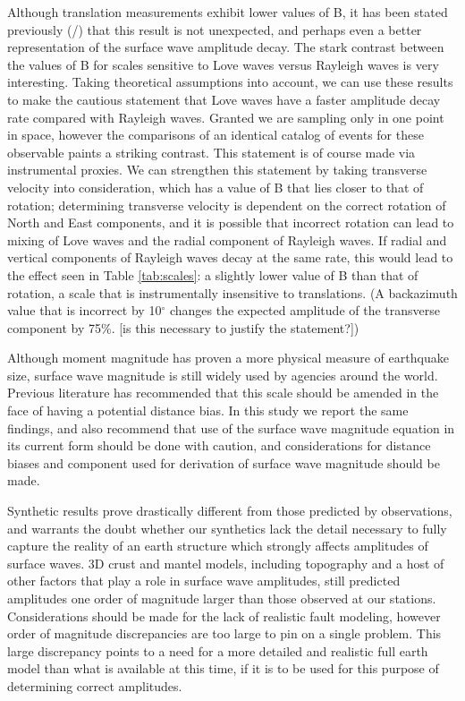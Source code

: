 \documentclass{gji}
\begin{document}
Although translation measurements exhibit lower values of B, it has been stated previously (\cite{herak1993distance}/\cite{ambraseys1997surface}) that this result is not unexpected, and perhaps even a better representation of the surface wave amplitude decay. The stark contrast between the values of B for scales sensitive to Love waves versus Rayleigh waves is very interesting. Taking theoretical assumptions into account, we can use these results to make the cautious statement that Love waves have a faster amplitude decay rate  compared with  Rayleigh waves. Granted we are sampling only in one point in space, however the comparisons of an identical catalog of events for these observable paints a striking contrast. This statement is of course made via instrumental proxies. We can strengthen this statement by taking transverse velocity into consideration, which has a value of B that lies closer to that of rotation; determining transverse velocity is dependent on the correct rotation of North and East components, and it is possible that incorrect rotation can lead to mixing of Love waves and the radial component of Rayleigh waves. If radial and vertical components of Rayleigh waves decay at the same rate, this would lead to the effect seen in Table \ref{tab:scales}: a slightly lower value of B than that of rotation, a scale that is instrumentally insensitive to translations. (A backazimuth value that is incorrect by 10$^\circ$ changes the expected amplitude of the transverse component by 75\%. [is this necessary to justify the statement?]) %

Although moment magnitude has proven a more physical measure of earthquake size, surface wave magnitude is still widely used by agencies around the world. Previous literature has recommended that this scale should be amended in the face of having a potential distance bias. In this study we report the same findings, and also recommend that use of the surface wave magnitude equation in its current form should be done with caution, and considerations for distance biases and component used for derivation of surface wave magnitude should be made.

Synthetic results prove drastically different from those predicted by observations, and warrants the doubt whether our synthetics lack the detail necessary to fully capture the reality of an earth structure which strongly affects amplitudes of surface waves. 3D crust and mantel models, including topography and a host of other factors that play a role in surface wave amplitudes, still predicted amplitudes one order of magnitude larger than those observed at our stations. Considerations should be made for the lack of realistic fault modeling, however order of magnitude discrepancies are too large to pin on a single problem. This large discrepancy points to a need for a more detailed and realistic full earth model than what is available at this time, if it is to be used for this purpose of determining correct amplitudes.
\end{document}
